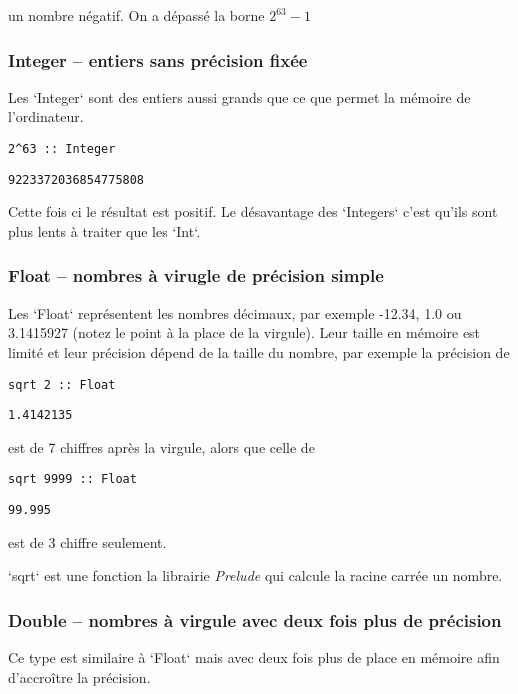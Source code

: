 \documentclass[11pt]{article}
\begin{document}
un nombre négatif.  On a dépassé la borne \(2^63-1\)

\subsubsection{Integer --  entiers sans précision fixée}
\label{sec:org176bbdc}

Les `Integer` sont des entiers aussi grands que ce que permet la mémoire de l'ordinateur.

\begin{verbatim}
2^63 :: Integer
\end{verbatim}
\begin{verbatim}
9223372036854775808
\end{verbatim}

Cette fois ci le résultat est positif.
Le désavantage des `Integers` c'est qu'ils sont plus lents à traiter que les `Int`.

\subsubsection{Float --   nombres à virugle de précision simple}
\label{sec:orgece1399}
Les `Float` représentent les nombres décimaux, par exemple -12.34, 1.0 ou 3.1415927 (notez le point à la place de la virgule).   Leur taille en mémoire est limité et leur précision dépend de la taille du nombre, par exemple la précision de 
\begin{verbatim}
sqrt 2 :: Float
\end{verbatim}
\begin{verbatim}
1.4142135
\end{verbatim}

est de 7 chiffres après la virgule, alors que celle de 

\begin{verbatim}
sqrt 9999 :: Float
\end{verbatim}
\begin{verbatim}
99.995
\end{verbatim}

est de 3 chiffre seulement.

`sqrt` est une fonction la librairie \emph{Prelude} qui calcule la racine carrée un nombre.

\subsubsection{Double --  nombres à virgule avec deux fois plus de précision}
\label{sec:org5bec984}
Ce type est similaire à `Float`  mais avec deux fois plus de place en mémoire afin d'accroître la précision.
\end{document}
